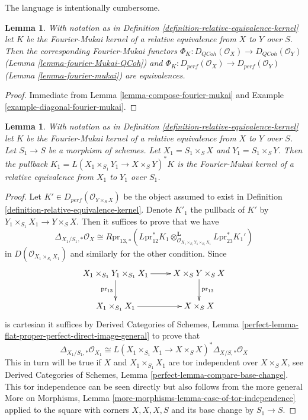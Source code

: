 \documentclass{stacks-project}
\theoremstyle{plain}
\newtheorem{lemma}[subsection]{Lemma}
\theoremstyle{definition}
\theoremstyle{remark}
\numberwithin{equation}{subsection}
\def\QCoh{\mathit{QCoh}}
\begin{document}
\noindent
The language is intentionally cumbersome.

\begin{lemma}
\label{lemma-equivalences-rek}
With notation as in Definition \ref{definition-relative-equivalence-kernel}
let $K$ be the Fourier-Mukai kernel of a relative equivalence from $X$
to $Y$ over $S$. Then the corresponding Fourier-Mukai functors
$\Phi_K : D_\QCoh(\mathcal{O}_X) \to D_\QCoh(\mathcal{O}_Y)$
(Lemma \ref{lemma-fourier-Mukai-QCoh})
and $\Phi_K : D_{perf}(\mathcal{O}_X) \to D_{perf}(\mathcal{O}_Y)$
(Lemma \ref{lemma-fourier-mukai})
are equivalences.
\end{lemma}

\begin{proof}
Immediate from Lemma \ref{lemma-compose-fourier-mukai} and
Example \ref{example-diagonal-fourier-mukai}.
\end{proof}

\begin{lemma}
\label{lemma-base-change-rek}
With notation as in Definition \ref{definition-relative-equivalence-kernel}
let $K$ be the Fourier-Mukai kernel of a relative equivalence from $X$
to $Y$ over $S$. Let $S_1 \to S$ be a morphism of schemes. Let
$X_1 = S_1 \times_S X$ and $Y_1 = S_1 \times_S Y$. Then the pullback
$K_1 = L(X_1 \times_{S_1} Y_1 \to X \times_S Y)^*K$ is
the Fourier-Mukai kernel of a relative equivalence from $X_1$
to $Y_1$ over $S_1$.
\end{lemma}

\begin{proof}
Let $K' \in D_{perf}(\mathcal{O}_{Y \times_S X})$ be the object assumed to
exist in Definition \ref{definition-relative-equivalence-kernel}.
Denote $K'_1$ the pullback of $K'$ by
$Y_1 \times_{S_1} X_1 \to Y \times_S X$.
Then it suffices to prove that we have
$$
\Delta_{X_1/S_1, *}\mathcal{O}_X \cong
R\text{pr}_{13, *}(L\text{pr}_{12}^*K_1
\otimes_{\mathcal{O}_{X_1 \times_{S_1} Y_1 \times_{S_1} X_1}}^\mathbf{L}
L\text{pr}_{23}^*K_1')
$$
in $D(\mathcal{O}_{X_1 \times_{S_1} X_1})$ and similarly for the other
condition. Since
$$
\xymatrix{
X_1 \times_{S_1} Y_1 \times_{S_1} X_1 \ar[r] \ar[d]_{\text{pr}_{13}} &
X \times_S Y \times_S X \ar[d]^{\text{pr}_{13}} \\
X_1 \times_{S_1} X_1 \ar[r] &
X \times_S X
}
$$
is cartesian it suffices by Derived Categories of Schemes, Lemma
\ref{perfect-lemma-flat-proper-perfect-direct-image-general}
to prove that
$$
\Delta_{X_1/S_1, *}\mathcal{O}_{X_1}
\cong
L(X_1 \times_{S_1} X_1 \to X \times_S X)^*\Delta_{X/S, *}\mathcal{O}_X 
$$
This in turn will be true if $X$ and $X_1 \times_{S_1} X_1$ are tor
independent over $X \times_S X$, see
Derived Categories of Schemes, Lemma \ref{perfect-lemma-compare-base-change}.
This tor independence can be seen directly but also follows from
the more general More on Morphisms, Lemma
\ref{more-morphisms-lemma-case-of-tor-independence} applied to the square
with corners $X, X, X, S$ and its base change by $S_1 \to S$.
\end{proof}
\end{document}

